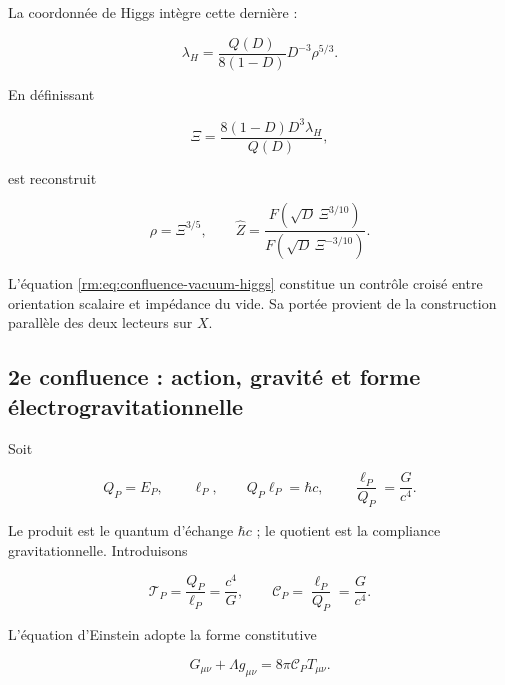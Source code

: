 La coordonnée de Higgs intègre cette dernière :

\begin{equation}
 \lambda_H=\frac{Q(D)}{8(1-D)}D^{-3}\rho^{5/3}.
 \label{rm:eq:confluence-higgs}
\end{equation}

En définissant

\begin{equation}
 \Xi=\frac{8(1-D)D^3\lambda_H}{Q(D)},
 \label{rm:eq:confluence-xi}
\end{equation}

est reconstruit

\begin{equation}
 \rho=\Xi^{3/5},
 \qquad
 \widehat Z=
 \frac{F(\sqrt D\,\Xi^{3/10})}
      {F(\sqrt D\,\Xi^{-3/10})}.
 \label{rm:eq:confluence-vacuum-higgs}
\end{equation}

L’équation \cref{rm:eq:confluence-vacuum-higgs} constitue un contrôle croisé entre orientation scalaire et impédance du vide. Sa portée provient de la construction parallèle des deux lecteurs sur \(X\).

\subsection{2e confluence : action, gravité et forme électrogravitationnelle}

Soit

\begin{equation}
 Q_P=E_P,
 \qquad
 \ell_P,
 \qquad
 Q_P\ell_P=\hbar c,
 \qquad
 \frac{\ell_P}{Q_P}=\frac{G}{c^4}.
 \label{rm:eq:confluence-planck-pair}
\end{equation}

Le produit est le quantum d’échange \(\hbar c\) ; le quotient est la compliance gravitationnelle. Introduisons

\begin{equation}
 \mathscr T_P=\frac{Q_P}{\ell_P}=\frac{c^4}{G},
 \qquad
 \mathscr C_P=\frac{\ell_P}{Q_P}=\frac{G}{c^4}.
 \label{rm:eq:confluence-tension-compliance}
\end{equation}

L’équation d’Einstein adopte la forme constitutive

\begin{equation}
 G_{\mu\nu}+\Lambda g_{\mu\nu}
 =8\pi\mathscr C_P T_{\mu\nu}.
 \label{rm:eq:confluence-einstein-constitutive}
\end{equation}

